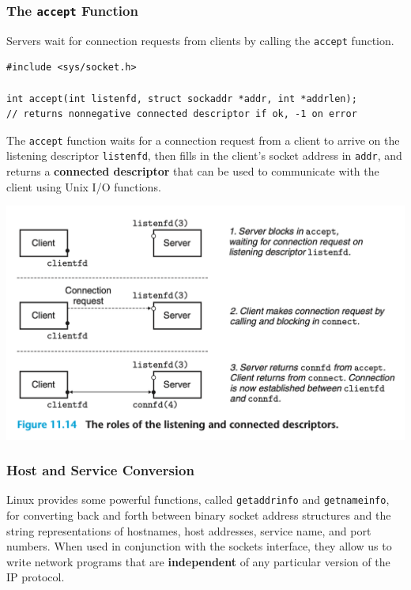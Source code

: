 \documentclass[11pt]{article}
\begin{document}
\subsubsection{The \texttt{accept} Function}
\label{sec:org66d50d8}
Servers wait for connection requests from clients by calling the \texttt{accept} function.\\

\begin{verbatim}
#include <sys/socket.h>

int accept(int listenfd, struct sockaddr *addr, int *addrlen);
// returns nonnegative connected descriptor if ok, -1 on error
\end{verbatim}

The \texttt{accept} function waits for a connection request from a client to arrive on the listening descriptor \texttt{listenfd}, then fills in the client’s socket address in \texttt{addr}, and returns a \textbf{connected descriptor} that can be used to communicate with the client using Unix I/O functions.\\


\begin{center}
\includegraphics[width=.9\linewidth]{pics/figure11.14-the-role-of-the-listening-and-connected-descriptors.png}
\end{center}

\subsubsection{Host and Service Conversion}
\label{sec:org2ad15e3}
Linux provides some powerful functions, called \texttt{getaddrinfo} and \texttt{getnameinfo}, for converting back and forth between binary socket address structures and the string representations of hostnames, host addresses, service name, and port numbers. When used in conjunction with the sockets interface, they allow us to write network programs that are \textbf{independent} of any particular version of the IP protocol.\\
\end{document}
